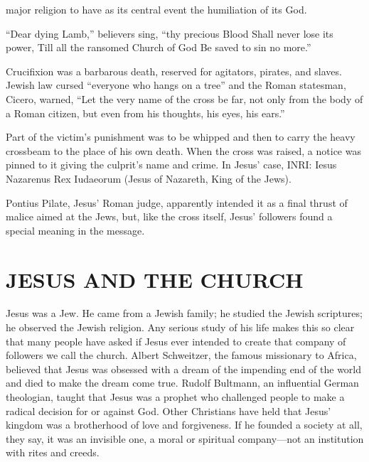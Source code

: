 
 major religion to have as its central event the humiliation of
its God.

\begin{blockquote}
“Dear dying Lamb,” believers sing, “thy precious Blood Shall never lose its power, Till all the
ransomed Church of God Be saved to sin no more.”
\end{blockquote}

Crucifixion was a barbarous death, reserved for agitators, pirates, and slaves. Jewish law cursed
“everyone who hangs on a tree” and the Roman statesman, Cicero, warned, “Let the very name of the
cross be far, not only from the body of a Roman citizen, but even from his thoughts, his eyes, his
ears.”

Part of the victim’s punishment was to be whipped and then to carry the heavy crossbeam to the place
of his own death. When the cross was raised, a notice was pinned to it giving the culprit’s name and
crime. In Jesus’ case, INRI: Iesus Nazarenus Rex Iudaeorum (Jesus of Nazareth, King of the Jews).

Pontius Pilate, Jesus’ Roman judge, apparently intended it as a final thrust of malice aimed at the
Jews, but, like the cross itself, Jesus’ followers found a special meaning in the message.

\section{JESUS AND THE CHURCH}

Jesus was a Jew. He came from a Jewish family; he studied the Jewish scriptures; he observed the
Jewish religion. Any serious study of his life makes this so clear that many people have asked if
Jesus ever intended to create that company of followers we call the church. Albert Schweitzer, the
famous missionary to Africa, believed that Jesus was obsessed with a dream of the impending end of
the world and died to make the dream come true. Rudolf Bultmann, an influential German theologian,
taught that Jesus was a prophet who challenged people to make a radical decision for or against God.
Other Christians have held that Jesus’ kingdom was a brotherhood of love and forgiveness. If he
founded a society at all, they say, it was an invisible one, a moral or spiritual company—not an
institution with rites and creeds.


